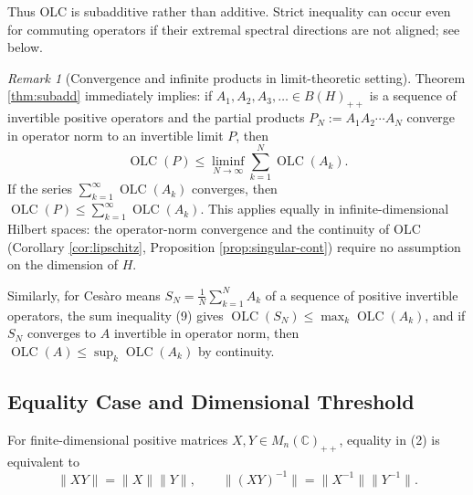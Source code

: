 \documentclass{article}
\theoremstyle{remark}
\newtheorem{remark}[theorem]{Remark}
\providecommand{\QLC}{\operatorname{OLC}}
\begin{document}
Thus OLC is subadditive rather than additive. Strict inequality can occur even for commuting operators if their extremal spectral directions are not aligned; see below.

\begin{remark}[Convergence and infinite products in limit-theoretic setting]
Theorem \ref{thm:subadd} immediately implies: if $A_1, A_2, A_3, \ldots\in B(H)_{++}$ is a sequence of invertible positive operators and the partial products $P_N:=A_1A_2\cdots A_N$ converge in operator norm to an invertible limit $P$, then
\[
\QLC(P) \le \liminf_{N\to\infty}\sum_{k=1}^N\QLC(A_k).
\]
If the series $\sum_{k=1}^\infty\QLC(A_k)$ converges, then $\QLC(P)\le\sum_{k=1}^\infty\QLC(A_k)$. This applies equally in infinite-dimensional Hilbert spaces: the operator-norm convergence and the continuity of OLC (Corollary \ref{cor:lipschitz}, Proposition \ref{prop:singular-cont}) require no assumption on the dimension of $H$. 

Similarly, for Ces\`aro means $S_N=\tfrac1N\sum_{k=1}^N A_k$ of a sequence of positive invertible operators, the sum inequality (9) gives $\QLC(S_N)\le\max_k\QLC(A_k)$, and if $S_N$ converges to $A$ invertible in operator norm, then $\QLC(A)\le\sup_k\QLC(A_k)$ by continuity.
\end{remark}

\subsection{Equality Case and Dimensional Threshold}\label{sec:threshold}

For finite-dimensional positive matrices $X,Y\in M_n(\mathbb{C})_{++}$, equality in (2) is equivalent to
\[
\|XY\| = \|X\|\|Y\|, \qquad \|(XY)^{-1}\| = \|X^{-1}\|\|Y^{-1}\|. \tag{4}
\]
\end{document}
